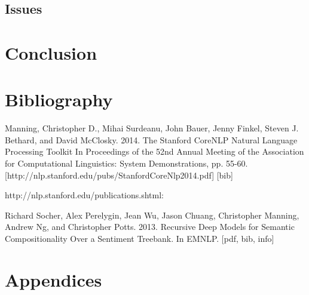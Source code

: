\documentclass[11pt]{article}
\begin{document}

\subsection{Issues}


\section{Conclusion}


\section{Bibliography}




Manning, Christopher D., Mihai Surdeanu, John Bauer, Jenny Finkel, Steven J. Bethard, and David McClosky. 2014. The Stanford CoreNLP Natural Language Processing Toolkit In Proceedings of the 52nd Annual Meeting of the Association for Computational Linguistics: System Demonstrations, pp. 55-60. [http://nlp.stanford.edu/pubs/StanfordCoreNlp2014.pdf] [bib]

http://nlp.stanford.edu/publications.shtml:

Richard Socher, Alex Perelygin, Jean Wu, Jason Chuang, Christopher Manning, Andrew Ng, and Christopher Potts. 2013. Recursive Deep Models for Semantic Compositionality Over a Sentiment Treebank. In EMNLP. [pdf, bib, info]

\section{Appendices}
\end{document}
